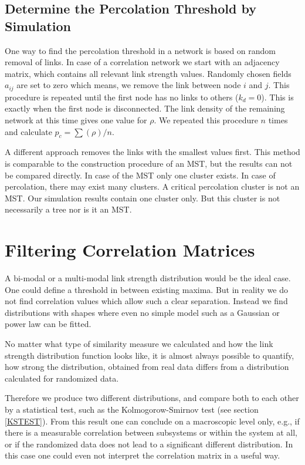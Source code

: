 \documentclass[a4paper,10pt]{scrbook}
\begin{document}
\subsection{Determine the Percolation Threshold by Simulation}
One way to find the percolation threshold in a network is based on random removal of links. In case of a correlation network we start with an adjacency matrix, which contains all relevant link strength values. Randomly chosen fields $a_{ij}$ are set to zero which means, we remove the link between node $i$ and $j$. This procedure is repeated until the first node has no links to others ($k_d = 0$). This is exactly when the first node is disconnected. The link density of the remaining network at this time gives one value for $\rho$. We repeated this procedure $n$ times and calculate $p_c = \sum( \rho ) / n$.  

A different approach removes the links with the smallest values first. This method is comparable to the construction procedure of an MST, but the results can not be compared directly. In case of the MST only one cluster exists. In case of percolation, there may exist many clusters. A critical percolation cluster is not an MST. Our simulation results contain one cluster only. But this cluster is not necessarily a tree nor is it an MST. 


\section{Filtering Correlation Matrices}
A bi-modal or a multi-modal link strength distribution would be the ideal case. One could define a threshold in between existing maxima. But in reality we do not find correlation values which allow such a clear separation. Instead we find distributions with shapes where even no simple model such as a Gaussian or power law can be fitted.

No matter what type of similarity measure we calculated and how the link strength distribution function looks like, it is almost always possible to quantify, how strong the distribution, obtained from real data differs from a distribution calculated for randomized data.

Therefore we produce two different distributions, and compare both to each other by a statistical test, such as the Kolmogorow-Smirnov test (see section \ref{KSTEST}). From this result one can conclude on a macroscopic level only, e.g., if there is a measurable correlation between subsystems or within the system at all, or if the randomized data does not lead to a significant different distribution. In this case one could even not interpret the correlation matrix in a useful way. 
\end{document}
